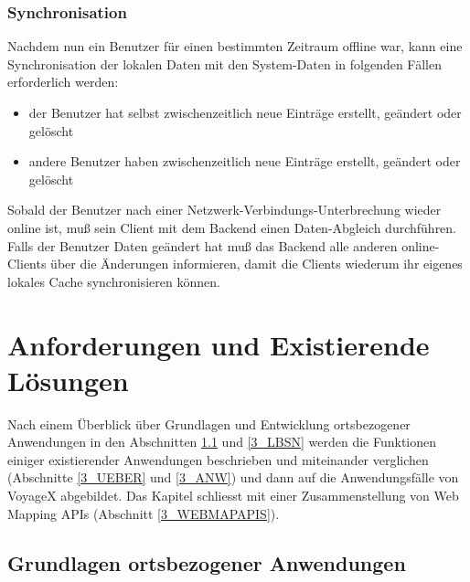 \subsubsection{Synchronisation}
Nachdem nun ein Benutzer für einen bestimmten Zeitraum offline war, kann eine Synchronisation
der lokalen Daten mit den System-Daten in folgenden Fällen erforderlich werden:
	\begin{itemize}
		\item der Benutzer hat selbst zwischenzeitlich neue Einträge erstellt, geändert oder gelöscht
		\item andere Benutzer haben zwischenzeitlich neue Einträge erstellt, geändert oder gelöscht
	\end{itemize}
Sobald der Benutzer nach einer Netzwerk-Verbindungs-Unterbrechung wieder online ist, muß sein Client mit dem Backend einen Daten-Abgleich durchführen. Falls der Benutzer Daten geändert hat muß das Backend alle anderen online-Clients über die Änderungen informieren, damit die Clients wiederum ihr eigenes lokales Cache synchronisieren können.




\newpage
%
%
\enlargethispage{3\baselineskip} %

\section{Anforderungen und Existierende Lösungen}
Nach einem Überblick über Grundlagen und Entwicklung ortsbezogener Anwendungen in den Abschnitten \ref{3_GRUNDL} und \ref{3_LBSN} werden die Funktionen einiger existierender Anwendungen beschrieben und miteinander verglichen (Abschnitte \ref{3_UEBER} und \ref{3_ANW}) und dann auf die Anwendungsfälle von VoyageX abgebildet. Das Kapitel schliesst mit einer Zusammenstellung von Web Mapping APIs (Abschnitt \ref{3_WEBMAPAPIS}).

\subsection{Grundlagen ortsbezogener Anwendungen}\label{3_GRUNDL}

